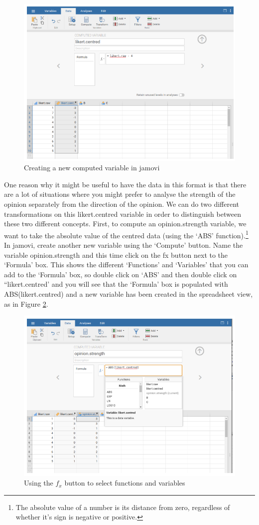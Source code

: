 \documentclass[
]{book}
\begin{document}
\begin{figure}
\includegraphics[width=0.9\linewidth]{images/Figure36} \caption{Creating a new computed variable in jamovi}\label{fig:fig6-4}
\end{figure}

One reason why it might be useful to have the data in this format is that there are a lot of situations where you might prefer to analyse the strength of the opinion separately from the direction of the opinion. We can do two different transformations on this likert.centred variable in order to distinguish between these two different concepts. First, to compute an opinion.strength variable, we want to take the absolute value of the centred data (using the `ABS' function).\footnote{The absolute value of a number is its distance from zero, regardless of whether it's sign is negative or positive.} In jamovi, create another new variable using the `Compute' button. Name the variable opinion.strength and this time click on the fx button next to the `Formula' box. This shows the different `Functions' and `Variables' that you can add to the `Formula' box, so double click on `ABS' and then double click on ``likert.centred' and you will see that the `Formula' box is populated with ABS(likert.centred) and a new variable has been created in the spreadsheet view, as in Figure \ref{fig:fig6-5}.

\begin{figure}
\includegraphics[width=0.9\linewidth]{images/Figure6_6} \caption{Using the $f_x$ button to select functions and variables}\label{fig:fig6-5}
\end{figure}
\end{document}

